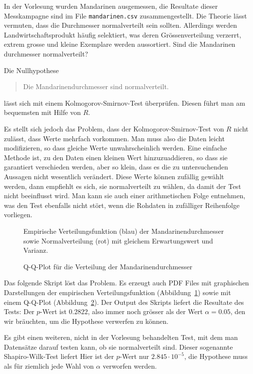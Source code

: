 In der Vorlesung wurden Mandarinen ausgemessen, die Resultate dieser
Messkampagne sind im File \texttt{mandarinen.csv} zusammengestellt.
Die Theorie lässt vermuten, dass die Durchmesser normalverteilt sein
sollten. Allerdings werden Landwirtschaftsprodukt häufig selektiert,
was deren Grössenverteilung verzerrt, extrem grosse und kleine
Exemplare werden aussortiert. Sind die Mandarinen durchmesser normalverteilt?

\begin{loesung}
Die Nullhypothese
\begin{quote}
Die Mandarinendurchmesser sind normalverteilt.
\end{quote}
lässt sich mit einem Kolmogorov-Smirnov-Test überprüfen. Diesen führt
man am bequemsten mit Hilfe von $R$.

Es stellt sich jedoch das Problem,
dass der Kolmogorov-Smirnov-Test von $R$ nicht zulässt, dass Werte
mehrfach vorkommen. Man muss also die Daten leicht modifizieren, so
dass gleiche Werte unwahrscheinlich werden. Eine einfache Methode ist,
zu den Daten einen kleinen Wert hinzuzuaddieren, so dass sie garantiert
verschieden werden, aber so klein, dass es die zu untersuchenden Aussagen
nicht wesentlich verändert. Diese Werte können zufällig gewählt werden,
dann empfiehlt es sich, sie normalverteilt zu wählen, da damit der Test
nicht beeinflusst wird. Man kann sie auch einer arithmetischen Folge
entnehmen, was den Test ebenfalls nicht stört, wenn die Rohdaten in
zufälliger Reihenfolge vorliegen.

\begin{figure}
\begin{center}
\end{center}
\caption{Empirische Verteilungsfunktion (blau) der Mandarinendurchmesser
sowie Normalverteilung (rot) mit gleichem Erwartungswert und Varianz.
\label{80000022:ecdf}}
\end{figure}
\begin{figure}
\begin{center}
\end{center}
\caption{Q-Q-Plot für die Verteilung der Mandarinendurchmesser
\label{80000022:qq}}
\end{figure}

Das folgende Skript löst das Problem. Es erzeugt auch PDF Files mit
graphischen Darstellungen der empirischen Verteilungsfunktion
(Abbildung~\ref{80000022:ecdf}) sowie mit einem Q-Q-Plot
(Abbildung~\ref{80000022:qq}).
{\small
{}
}
Der Output des Skripts liefert die Resultate des Tests:
Der $p$-Wert ist $0.2822$, also immer noch grösser als der Wert
$\alpha = 0.05$, den wir bräuchten, um die Hypothese verwerfen zu können.

Es gibt einen weiteren, nicht in der Vorlesung behandelten Test, mit dem
man Datensätze darauf testen kann, ob sie normalverteilt sind. Dieser
sogenannte Shapiro-Wilk-Test liefert 
Hier ist der $p$-Wert nur $2.845\cdot 10^{-5}$, die Hypothese muss
als für ziemlich jede Wahl von $\alpha$ verworfen werden.
\end{loesung}

